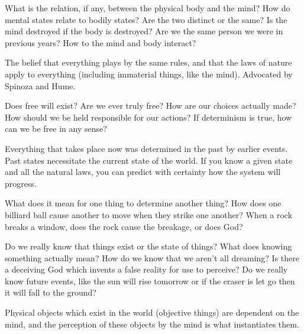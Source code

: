 \begin{problem}
What is the relation, if any, between the physical body and the mind? How do mental states relate to bodily states? Are the two distinct or the same? Is the mind destroyed if the body is destroyed? Are we the same person we were in previous years? How to the mind and body interact?
\end{problem}

\begin{definition}[Naturalism]
The belief that everything plays by the same rules, and that the laws of nature apply to everything (including immaterial things, like the mind). Advocated by Spinoza and Hume. 
\end{definition}

\begin{problem}[Freedom]
Does free will exist? Are we ever truly free? How are our choices actually made? How should we be held responsible for our actions? If determinism is true, how can we be free in any sense?
\end{problem}

\begin{definition}[Determinism]
Everything that takes place now was determined in the past by earlier events. Past states necessitate the current state of the world. If you know a given state and all the natural laws, you can predict with certainty how the system will progress.
\end{definition}

\begin{problem}[Causation]
What does it mean for one thing to determine another thing? How does one billiard ball cause another to move when they strike one another? When a rock breaks a window, does the rock cause the breakage, or does God?
\end{problem}

\begin{problem}[Skepticism]
Do we really know that things exist or the state of things? What does knowing something actually mean? How do we know that we aren't all dreaming? Is there a deceiving God which invents a false reality for use to perceive? Do we really know future events, like the sun will rise tomorrow or if the eraser is let go then it will fall to the ground?
\end{problem}

\begin{definition}[Idealism]
Physical objects which exist in the world (objective things) are dependent on the mind, and the perception of these objects by the mind is what instantiates them.
\end{definition}

